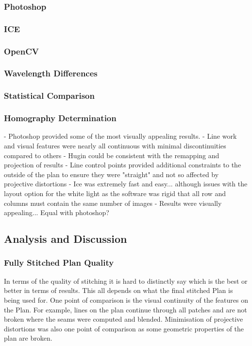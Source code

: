 \subsubsection{Photoshop}

\subsubsection{ICE}

\subsubsection{OpenCV}

\subsubsection{Wavelength Differences}

\subsubsection{Statistical Comparison}

\subsubsection{Homography Determination}

- Photoshop provided some of the most visually appealing results.
- Line work and visual features were nearly all continuous with minimal discontinuities compared to others
- Hugin could be consistent with the remapping and projection of results
- Line control points provided additional constraints to the outside of the plan to ensure they were "straight" and not so affected by projective distortions
- Ice was extremely fast and easy... although issues with the layout option for the white light as the software was rigid that all row and columns must contain the same number of images
- Results were visually appealing... Equal with photoshop?

\subsection{Analysis and Discussion}
\label{sec:DiscussionStitching}

	\subsubsection{Fully Stitched Plan Quality}
	\label{sec:PlanQuality}
	In terms of the quality of stitching it is hard to distinctly say which is the best or better in terms of results. This all depends on what the final stitched Plan is being used for. One point of comparison is the visual continuity of the features on the Plan. For example, lines on the plan continue through all patches and are not broken where the seams were computed and blended. Minimisation of projective distortions was also one point of comparison as some geometric properties of the plan are broken.
	
